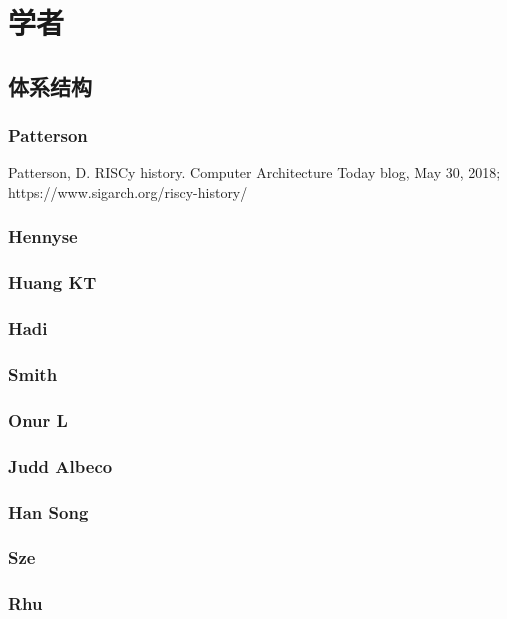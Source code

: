 \chapter{学者}


\section{体系结构}

\subsection{Patterson}

Patterson, D. RISCy history. Computer Architecture
Today blog, May 30, 2018; https://www.sigarch.org/riscy-history/


\subsection{Hennyse}

\subsection{Huang KT}

\subsection{Hadi}

\subsection{Smith}

\subsection{Onur L}

\subsection{Judd Albeco}

\subsection{Han Song }

\subsection{Sze  }

\subsection{Rhu }


